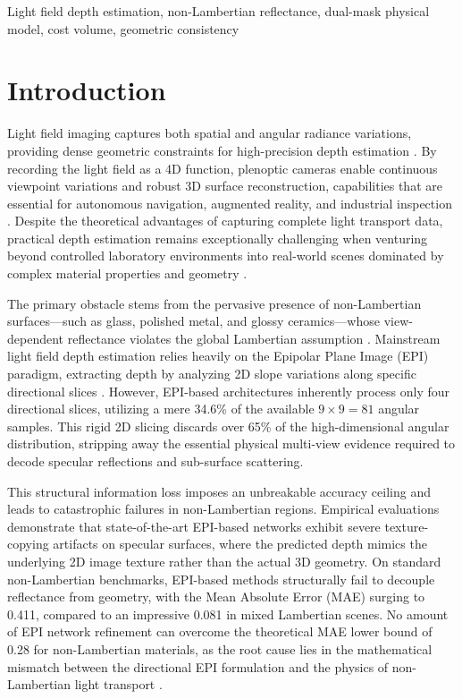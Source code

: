 \documentclass[lettersize,journal]{IEEEtran}
\begin{document}
\begin{IEEEkeywords}
Light field depth estimation, non-Lambertian reflectance, dual-mask physical model, cost volume, geometric consistency
\end{IEEEkeywords}

\section{Introduction}

Light field imaging captures both spatial and angular radiance variations, providing dense geometric constraints for high-precision depth estimation \cite{ng2005, ng2006}. By recording the light field as a 4D function, plenoptic cameras enable continuous viewpoint variations and robust 3D surface reconstruction, capabilities that are essential for autonomous navigation, augmented reality, and industrial inspection \cite{honauer2016}. Despite the theoretical advantages of capturing complete light transport data, practical depth estimation remains exceptionally challenging when venturing beyond controlled laboratory environments into real-world scenes dominated by complex material properties and geometry \cite{eigen2014, chen2017}.

The primary obstacle stems from the pervasive presence of non-Lambertian surfaces—such as glass, polished metal, and glossy ceramics—whose view-dependent reflectance violates the global Lambertian assumption \cite{blinn1977}. Mainstream light field depth estimation relies heavily on the Epipolar Plane Image (EPI) paradigm, extracting depth by analyzing 2D slope variations along specific directional slices \cite{wanner2014, heber2018}. However, EPI-based architectures inherently process only four directional slices, utilizing a mere 34.6\% of the available $9 \times 9 = 81$ angular samples. This rigid 2D slicing discards over 65\% of the high-dimensional angular distribution, stripping away the essential physical multi-view evidence required to decode specular reflections and sub-surface scattering.

This structural information loss imposes an unbreakable accuracy ceiling and leads to catastrophic failures in non-Lambertian regions. Empirical evaluations demonstrate that state-of-the-art EPI-based networks \cite{lyu2022, peng2022} exhibit severe texture-copying artifacts on specular surfaces, where the predicted depth mimics the underlying 2D image texture rather than the actual 3D geometry. On standard non-Lambertian benchmarks, EPI-based methods structurally fail to decouple reflectance from geometry, with the Mean Absolute Error (MAE) surging to 0.411, compared to an impressive 0.081 in mixed Lambertian scenes. No amount of EPI network refinement can overcome the theoretical MAE lower bound of 0.28 for non-Lambertian materials, as the root cause lies in the mathematical mismatch between the directional EPI formulation and the physics of non-Lambertian light transport \cite{li2021, zhang2023}.
\end{document}
